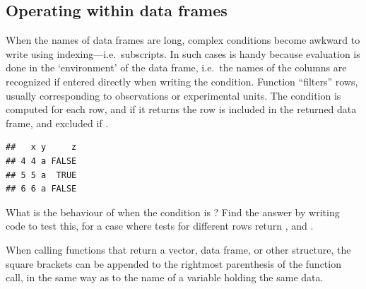\documentclass[krantz2]{krantz}\usepackage{knitr}%
\begin{document}
\subsection{Operating within data frames}\label{sec:calc:df:with}
When the names of data frames are long, complex conditions become awkward to write using indexing---i.e.\ subscripts. In such cases  is handy because evaluation is done in the `environment' of the data frame, i.e.\ the names of the columns are recognized if entered directly when writing the condition. Function   ``filters'' rows, usually corresponding to observations or experimental units. The condition is computed for each row, and if it returns  the row is included in the returned data frame, and excluded if .

\begin{knitrout}\footnotesize
{}\color{fgcolor}\begin{kframe}
\begin{alltt}
 \hlkwb{<-} \hlstd{(} \hlstd{=} \hlopt{:}\hlstd{,}  \hlstd{=} \hlstd{,}  \hlstd{=} \hlstd{(}\hlstd{,} \hlstd{))}
 \hlopt{>} \hlstd{)}
\end{alltt}
\begin{verbatim}
##   x y     z
## 4 4 a FALSE
## 5 5 a  TRUE
## 6 6 a FALSE
\end{verbatim}
\end{kframe}
\end{knitrout}

\begin{playground}
What is the behaviour of  when the condition is ? Find the answer by writing code to test this, for a case where tests for different rows return ,  and .
\end{playground}

When calling functions that return a vector, data frame, or other structure, the square brackets can be appended to the rightmost parenthesis of the function call, in the same way as to the name of a variable holding the same data.
\end{document}
